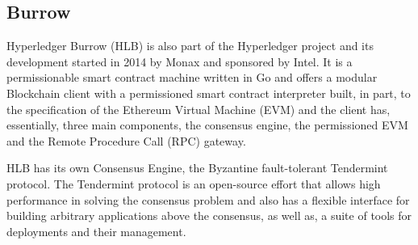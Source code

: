   \subsection{Burrow}

  Hyperledger Burrow (HLB) is also part of the Hyperledger project and its
  development started in 2014 by Monax and sponsored by Intel. It is a
  permissionable smart contract machine written in Go and offers a modular
  Blockchain client with a permissioned smart contract interpreter built, in
  part, to the specification of the Ethereum Virtual Machine (EVM) and the client
  has, essentially, three main components, the consensus engine, the permissioned
  EVM and the Remote Procedure Call (RPC) gateway.
  \cite{Kuhlman2017,HyperledgerBurrow2017}

  HLB has its own Consensus Engine, the Byzantine fault-tolerant Tendermint
  protocol.  The Tendermint protocol is an open-source effort that allows high
  performance in solving the consensus problem and also has a flexible interface
  for building arbitrary applications above the consensus, as well as, a suite of
  tools for deployments and their management. \cite{Buchman2016}
